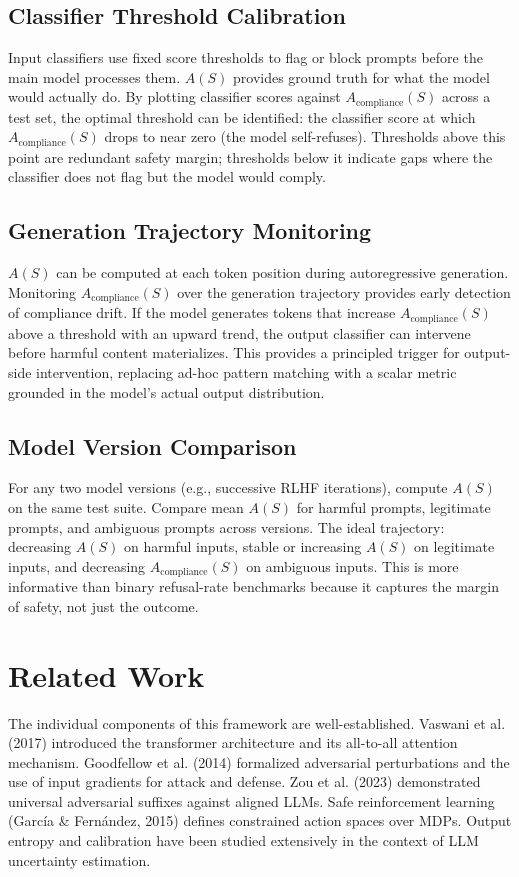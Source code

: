 \documentclass[11pt,letterpaper]{article}
\begin{document}
\subsection{Classifier Threshold Calibration}
Input classifiers use fixed score thresholds to flag or block prompts before the main model processes them. $A(S)$ provides ground truth for what the model would actually do. By plotting classifier scores against $A_{\mathrm{compliance}}(S)$ across a test set, the optimal threshold can be identified: the classifier score at which $A_{\mathrm{compliance}}(S)$ drops to near zero (the model self-refuses). Thresholds above this point are redundant safety margin; thresholds below it indicate gaps where the classifier does not flag but the model would comply.

\subsection{Generation Trajectory Monitoring}
$A(S)$ can be computed at each token position during autoregressive generation. Monitoring $A_{\mathrm{compliance}}(S)$ over the generation trajectory provides early detection of compliance drift. If the model generates tokens that increase $A_{\mathrm{compliance}}(S)$ above a threshold with an upward trend, the output classifier can intervene before harmful content materializes. This provides a principled trigger for output-side intervention, replacing ad-hoc pattern matching with a scalar metric grounded in the model's actual output distribution.

\subsection{Model Version Comparison}
For any two model versions (e.g., successive RLHF iterations), compute $A(S)$ on the same test suite. Compare mean $A(S)$ for harmful prompts, legitimate prompts, and ambiguous prompts across versions. The ideal trajectory: decreasing $A(S)$ on harmful inputs, stable or increasing $A(S)$ on legitimate inputs, and decreasing $A_{\mathrm{compliance}}(S)$ on ambiguous inputs. This is more informative than binary refusal-rate benchmarks because it captures the margin of safety, not just the outcome.

\section{Related Work}
The individual components of this framework are well-established. Vaswani et al. (2017) introduced the transformer architecture and its all-to-all attention mechanism. Goodfellow et al. (2014) formalized adversarial perturbations and the use of input gradients for attack and defense. Zou et al. (2023) demonstrated universal adversarial suffixes against aligned LLMs. Safe reinforcement learning (Garc\'ia \& Fern\'andez, 2015) defines constrained action spaces over MDPs. Output entropy and calibration have been studied extensively in the context of LLM uncertainty estimation.
\end{document}
